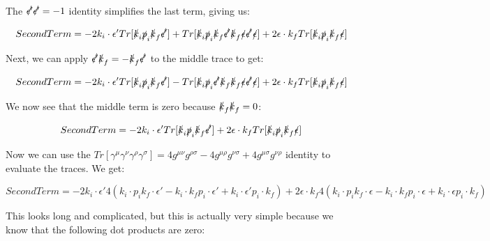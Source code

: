 \documentclass[a4]{article}
\begin{document}
    The $\slashed{\epsilon'} \slashed{\epsilon'} = -1$ identity simplifies the last term, giving us:

    \begin{equation}
        Second Term = - 2 k_i \cdot \epsilon' Tr [ \slashed{k}_i \slashed{p}_i \slashed{k}_f \slashed{\epsilon'} ] + Tr[ \slashed{k}_i \slashed{p}_i \slashed{k}_f \slashed{\epsilon'} \slashed{k}_f \slashed{\epsilon} \slashed{\epsilon'} \slashed{\epsilon} ] + 2 \epsilon \cdot k_f Tr [ \slashed{k}_i \slashed{p}_i \slashed{k}_f \slashed{\epsilon} ]
    \end{equation}

    Next, we can apply $\slashed{\epsilon'} \slashed{k}_f = - \slashed{k}_f \slashed{\epsilon'}$ to the middle trace to get:

    \begin{equation}
        Second Term = - 2 k_i \cdot \epsilon' Tr [ \slashed{k}_i \slashed{p}_i \slashed{k}_f \slashed{\epsilon'} ] - Tr[ \slashed{k}_i \slashed{p}_i \slashed{\epsilon'} \slashed{k}_f \slashed{k}_f \slashed{\epsilon} \slashed{\epsilon'} \slashed{\epsilon} ] + 2 \epsilon \cdot k_f Tr [ \slashed{k}_i \slashed{p}_i \slashed{k}_f \slashed{\epsilon} ]
    \end{equation}

    We now see that the middle term is zero because $\slashed{k}_f \slashed{k}_f = 0$:

    \begin{equation}
        Second Term = - 2 k_i \cdot \epsilon' Tr [ \slashed{k}_i \slashed{p}_i \slashed{k}_f \slashed{\epsilon'} ] + 2 \epsilon \cdot k_f Tr [ \slashed{k}_i \slashed{p}_i \slashed{k}_f \slashed{\epsilon} ]
    \end{equation}

    Now we can use the $Tr [\gamma^\mu \gamma^\nu \gamma^\rho \gamma^\sigma] = 4 g^{\mu \nu} g^{\rho \sigma} - 4 g^{\mu \rho} g^{\nu \sigma} + 4 g^{\mu \sigma} g^{\nu \rho}$ identity to evaluate the traces. We get:

    \begin{equation}
        Second Term = -2 k_i \cdot \epsilon' 4 (k_i \cdot p_i k_f \cdot \epsilon' - k_i \cdot k_f p_i \cdot \epsilon' + k_i \cdot \epsilon'  p_i \cdot k_f) + 2 \epsilon \cdot k_f 4 (k_i \cdot p_i k_f \cdot \epsilon - k_i \cdot k_f p_i \cdot \epsilon + k_i \cdot \epsilon  p_i \cdot k_f)
    \end{equation}

    This looks long and complicated, but this is actually very simple because we know that the following dot products are zero:
\end{document}

